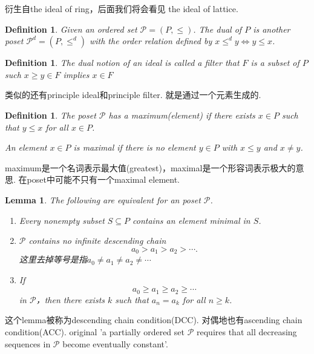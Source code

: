 \documentclass{article}
\newtheorem{lemma}[theorem]{Lemma}
\newtheorem{definition}[theorem]{Definition}
\begin{document}
{ \color{blue} 衍生自the ideal of ring，后面我们将会看见 the ideal of lattice}.

\begin{definition}
\rm Given an ordered set $\mathcal{P}=(P,\leq)$. The {\color{red} dual of $P$} is another poset $\mathcal{P}^d=(P,\leq^d)$ with the order relation defined by $x \leq^d y \iff y \leq x$. 
\end{definition}

\begin{definition}
\rm The dual notion of an ideal is called a {\color{red} filter} that $F$ is a subset of $P$ such $x \geq y \in F$ implies $x \in F$  
\end{definition}

{\color{blue} 类似的还有principle ideal和principle filter. 就是通过一个元素生成的}.

\begin{definition}
\rm The poset $\mathcal{P}$ has a {\color{red} maximum}(element) if there exists $x \in P$ such that $y \leq x$ for all $x \in P$.

An element $x \in P$ is {\color{red} maximal}	if there is no element $y \in  P$ with $x \leq y$ and $x \neq y$. 
\end{definition}

{\color{blue} maximum是一个名词表示最大值(greatest)，maximal是一个形容词表示极大的意思. 在poset中可能不只有一个maximal element}.

\begin{lemma}
\rm The following are equivalent for an poset $\mathcal{P}$.

\begin{enumerate}
	\item Every nonempty subset $S \subseteq P$ contains an element minimal in $S$.
	\item $\mathcal{P}$ contains no infinite descending chain \[a_0 > a_1 > a_2 > \cdots.\]{\color{blue} 这里去掉等号是指$a_0 \neq a_1 \neq a_2 \neq \cdots$} 
	\item If \[a_0 \geq a_1 \geq a_2 \geq \cdots\] in $\mathcal{P}$，then there exists $k$ such that $a_n = a_k$ for all $n \geq k$.
\end{enumerate}
\end{lemma}

{\color{red} 这个lemma被称为descending chain condition(DCC). 对偶地也有ascending chain condition(ACC). original 'a partially ordered set $\mathcal{P}$ requires that all decreasing sequences in $\mathcal{P}$ become eventually constant'}.
\end{document}
